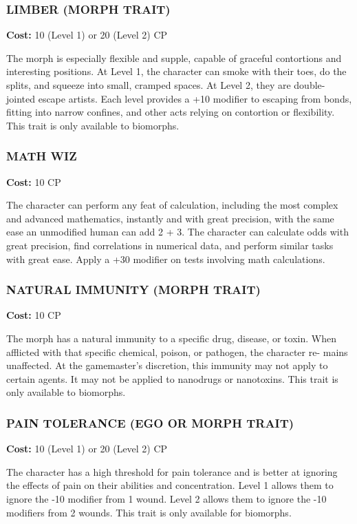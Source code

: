 \subsubsection{LIMBER (MORPH TRAIT)}
\textbf{Cost:} 10 (Level 1) or 20 (Level 2) CP

The morph is especially flexible and supple, capable of graceful contortions
and interesting positions. At Level 1, the character can smoke with their toes,
do the splits, and squeeze into small, cramped spaces. At Level 2, they are
double-jointed escape artists. Each level provides a +10 modifier to escaping
from bonds, fitting into narrow confines, and other acts relying on contortion
or flexibility. This trait is only available to biomorphs.

\subsubsection{MATH WIZ}
\textbf{Cost:} 10 CP

The character can perform any feat of calculation, including the most complex
and advanced mathematics, instantly and with great precision, with the same
ease an unmodified human can add 2 + 3. The character can calculate odds with
great precision, find correlations in numerical data, and perform similar tasks
with great ease. Apply a +30 modifier on tests involving math calculations.

\subsubsection{NATURAL IMMUNITY (MORPH TRAIT)}
\textbf{Cost:} 10 CP

The morph has a natural immunity to a specific drug, disease, or toxin. When
afflicted with that specific chemical, poison, or pathogen, the character re-
mains unaffected. At the gamemaster’s discretion, this immunity may not apply
to certain agents. It may not be applied to nanodrugs or nanotoxins. This trait
is only available to biomorphs.

\subsubsection{PAIN TOLERANCE (EGO OR MORPH TRAIT)}
\textbf{Cost:} 10 (Level 1) or 20 (Level 2) CP

The character has a high threshold for pain tolerance and is better at
ignoring the effects of pain on their abilities and concentration. Level 1
allows them to ignore the -10 modifier from 1 wound. Level 2 allows them to
ignore the -10 modifiers from 2 wounds. This trait is only available for
biomorphs.

